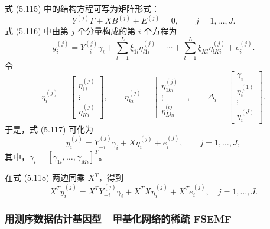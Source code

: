 式 (5.115) 中的结构方程可写为矩阵形式：
\begin{equation}
Y^{(j)}\Gamma+XB^{(j)}+E^{(j)}=0,\qquad j=1,\ldots,J.
\tag{5.116}
\end{equation}
式 (5.116) 中由第 $j$ 个分量构成的第 $i$ 个方程为
\begin{equation}
y_i^{(j)}=Y_{-i}^{(j)}\gamma_i+\sum_{l=1}^L\xi_{1l}\eta_{l1i}^{(j)}
+\cdots+\sum_{l=1}^L\xi_{Kl}\eta_{lKi}^{(j)}+e_i^{(j)}.
\tag{5.117}
\end{equation}
令
\[
\eta_i^{(j)}=\begin{bmatrix}\eta_{1i}^{(j)}\\\vdots\\\eta_{Ki}^{(j)}\end{bmatrix},\qquad
\eta_{ki}^{(j)}=\begin{bmatrix}\eta_{1ki}^{(j)}\\\vdots\\\eta_{Lki}^{(ij}\end{bmatrix},\qquad
\Delta_i=\begin{bmatrix}\gamma_i\\\eta_i^{(1)}\\\vdots\\\eta_i^{(J)}\end{bmatrix}.
\]
于是，式 (5.117) 可化为
\begin{equation}
y_i^{(j)}=Y_{-i}^{(j)}\gamma_i+X\eta_i^{(j)}+e_i^{(j)},\qquad j=1,\ldots,J,
\tag{5.118}
\end{equation}
其中，$\gamma_i=[\gamma_{1i},\ldots,\gamma_{Mi}]^T$。

在式 (5.118) 两边同乘 $X^T$，得到
\begin{equation}
X^Ty_i^{(j)}=X^TY_{-i}^{(j)}\gamma_i+X^TX\eta_i^{(j)}+X^Te_i^{(j)},\quad j=1,\ldots,J.
\tag{5.119}
\end{equation}

\subsubsection{用测序数据估计基因型—甲基化网络的稀疏 FSEMF}

